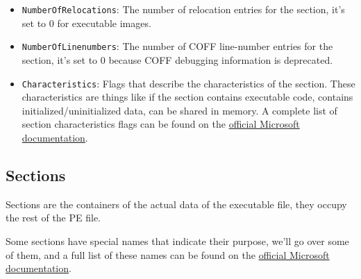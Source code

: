 \begin{itemize}
        \item \verb+NumberOfRelocations+: The number of relocation entries for the section, it’s set to 0 for executable images.
        \item \verb+NumberOfLinenumbers+: The number of COFF line-number entries for the section, it’s set to 0 because COFF debugging information is deprecated.
        \item \verb+Characteristics+: Flags that describe the characteristics of the section.  These characteristics are things like if the section contains executable code, contains initialized/uninitialized data, can be shared in memory. A complete list of section characteristics flags can be found on the \href{https://learn.microsoft.com/en-us/windows/win32/debug/pe-format#section-flags}{official Microsoft documentation}.

\end{itemize}

\subsection{Sections}

Sections are the containers of the actual data of the executable file, they occupy the rest of the PE file.

Some sections have special names that indicate their purpose, we’ll go over some of them, and a full list of these names can be found on the \href{Some sections have special names that indicate their purpose, we’ll go over some of them, and a full list of these names can be found on the official Microsoft documentation }{official Microsoft documentation}.


